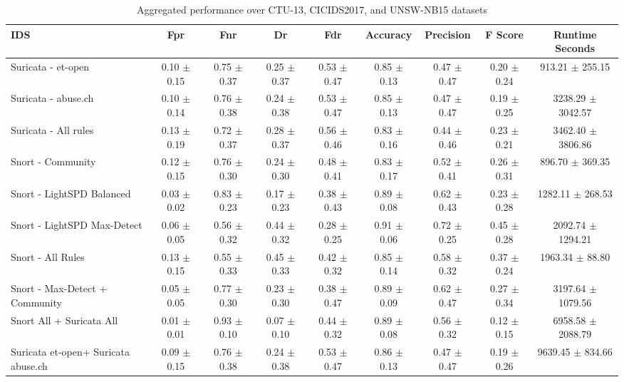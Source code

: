 \begin{table}[t]
    \centering
    \caption{Aggregated performance over CTU-13, CICIDS2017, and UNSW-NB15 datasets}
    \label{tab:ids_performance_aggregated}
    \renewcommand{\arraystretch}{1.5}
    \begin{tabular}{lcccccccc}
        \toprule
        \textbf{IDS} & \textbf{Fpr} & \textbf{Fnr} & \textbf{Dr} & \textbf{Fdr} & \textbf{Accuracy} & \textbf{Precision} & \textbf{F Score} & \textbf{Runtime Seconds} \\
        \midrule
        Suricata - et-open & 0.10 $\pm$ 0.15 & 0.75 $\pm$ 0.37 & 0.25 $\pm$ 0.37 & 0.53 $\pm$ 0.47 & 0.85 $\pm$ 0.13 & 0.47 $\pm$ 0.47 & 0.20 $\pm$ 0.24 & 913.21 $\pm$ 255.15 \\
        Suricata - abuse.ch & 0.10 $\pm$ 0.14 & 0.76 $\pm$ 0.38 & 0.24 $\pm$ 0.38 & 0.53 $\pm$ 0.47 & 0.85 $\pm$ 0.13 & 0.47 $\pm$ 0.47 & 0.19 $\pm$ 0.25 & 3238.29 $\pm$ 3042.57 \\
        Suricata - All rules & 0.13 $\pm$ 0.19 & 0.72 $\pm$ 0.37 & 0.28 $\pm$ 0.37 & 0.56 $\pm$ 0.46 & 0.83 $\pm$ 0.16 & 0.44 $\pm$ 0.46 & 0.23 $\pm$ 0.21 & 3462.40 $\pm$ 3806.86 \\
        Snort - Community & 0.12 $\pm$ 0.15 & 0.76 $\pm$ 0.30 & 0.24 $\pm$ 0.30 & 0.48 $\pm$ 0.41 & 0.83 $\pm$ 0.17 & 0.52 $\pm$ 0.41 & 0.26 $\pm$ 0.31 & 896.70 $\pm$ 369.35 \\
        Snort - LightSPD Balanced & 0.03 $\pm$ 0.02 & 0.83 $\pm$ 0.23 & 0.17 $\pm$ 0.23 & 0.38 $\pm$ 0.43 & 0.89 $\pm$ 0.08 & 0.62 $\pm$ 0.43 & 0.23 $\pm$ 0.28 & 1282.11 $\pm$ 268.53 \\
        Snort - LightSPD Max-Detect & 0.06 $\pm$ 0.05 & 0.56 $\pm$ 0.32 & 0.44 $\pm$ 0.32 & 0.28 $\pm$ 0.25 & 0.91 $\pm$ 0.06 & 0.72 $\pm$ 0.25 & 0.45 $\pm$ 0.28 & 2092.74 $\pm$ 1294.21 \\
        Snort - All Rules & 0.13 $\pm$ 0.15 & 0.55 $\pm$ 0.33 & 0.45 $\pm$ 0.33 & 0.42 $\pm$ 0.32 & 0.85 $\pm$ 0.14 & 0.58 $\pm$ 0.32 & 0.37 $\pm$ 0.24 & 1963.34 $\pm$ 88.80 \\
        Snort - Max-Detect + Community & 0.05 $\pm$ 0.05 & 0.77 $\pm$ 0.30 & 0.23 $\pm$ 0.30 & 0.38 $\pm$ 0.47 & 0.89 $\pm$ 0.09 & 0.62 $\pm$ 0.47 & 0.27 $\pm$ 0.34 & 3197.64 $\pm$ 1079.56 \\
        Snort All + Suricata All & 0.01 $\pm$ 0.01 & 0.93 $\pm$ 0.10 & 0.07 $\pm$ 0.10 & 0.44 $\pm$ 0.32 & 0.89 $\pm$ 0.08 & 0.56 $\pm$ 0.32 & 0.12 $\pm$ 0.15 & 6958.58 $\pm$ 2088.79 \\
        Suricata et-open+ Suricata abuse.ch & 0.09 $\pm$ 0.15 & 0.76 $\pm$ 0.38 & 0.24 $\pm$ 0.38 & 0.53 $\pm$ 0.47 & 0.86 $\pm$ 0.13 & 0.47 $\pm$ 0.47 & 0.19 $\pm$ 0.26 & 9639.45 $\pm$ 834.66 \\
        \bottomrule
    \end{tabular}
\end{table}
